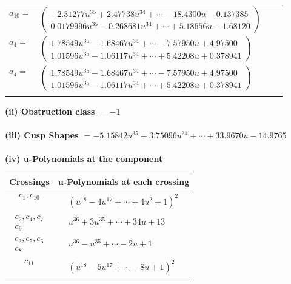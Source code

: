 \documentclass[1p]{elsarticle_modified}
\theoremstyle{definition}
\begin{document}
\begin{tabular}{m{7pt} m{180pt} m{7pt} m{180pt} }
\flushright $a_{10}=$&$\begin{pmatrix}-2.31277 u^{35}+2.47738 u^{34}+\cdots-18.4300 u-0.137385\\0.0179996 u^{35}-0.268681 u^{34}+\cdots+5.18656 u-1.68120\end{pmatrix}$ \\
\flushright $a_{4}=$&$\begin{pmatrix}1.78549 u^{35}-1.68467 u^{34}+\cdots-7.57950 u+4.97500\\1.01596 u^{35}-1.06117 u^{34}+\cdots+5.42208 u+0.378941\end{pmatrix}$\\ \flushright $a_{4}=$&$\begin{pmatrix}1.78549 u^{35}-1.68467 u^{34}+\cdots-7.57950 u+4.97500\\1.01596 u^{35}-1.06117 u^{34}+\cdots+5.42208 u+0.378941\end{pmatrix}$\\&\end{tabular}
\flushleft \textbf{(ii) Obstruction class $= -1$}\\~\\
\flushleft \textbf{(iii) Cusp Shapes $= -5.15842 u^{35}+3.75096 u^{34}+\cdots+33.9670 u-14.9765$}\\~\\
\newpage\renewcommand{\arraystretch}{1}
\flushleft \textbf{(iv) u-Polynomials at the component}\newline \\
\begin{tabular}{m{50pt}|m{274pt}}
Crossings & \hspace{64pt}u-Polynomials at each crossing \\
\hline $$\begin{aligned}c_{1},c_{10}\end{aligned}$$&$\begin{aligned}
&(u^{18}-4 u^{17}+\cdots+4 u^2+1)^{2}
\end{aligned}$\\
\hline $$\begin{aligned}c_{2},c_{4},c_{7}\\c_{9}\end{aligned}$$&$\begin{aligned}
&u^{36}+3 u^{35}+\cdots+34 u+13
\end{aligned}$\\
\hline $$\begin{aligned}c_{3},c_{5},c_{6}\\c_{8}\end{aligned}$$&$\begin{aligned}
&u^{36}- u^{35}+\cdots-2 u+1
\end{aligned}$\\
\hline $$\begin{aligned}c_{11}\end{aligned}$$&$\begin{aligned}
&(u^{18}-5 u^{17}+\cdots-8 u+1)^{2}
\end{aligned}$\\
\hline
\end{tabular}\\~\\
\end{document}
